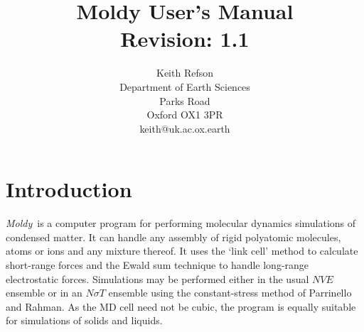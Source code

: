 % 
% 
% 
% 
\oddsidemargin=0in
\textwidth=6.5in
{\def\$#1${#1}%
\xdef\RCSrevision{\$Revision: 1.1 $}\xdef\manversA{$\$junk $ $}}
\title{{\Huge Moldy User's Manual}\\ \RCSrevision}
\author{Keith Refson\\Department of Earth Sciences\\Parks Road
\\Oxford OX1 3PR\\keith@uk.ac.ox.earth\\}

\newcommand{\moldy}{{\em Moldy}}
\newcommand{\etc}{{\em etc}}
\newcommand{\eg}{{\em e.g}.\ }
\newcommand{\ie}{{\em i.e}.\ }
\newcommand{\bm}[1]{\mbox{\boldmath \protect\(#1\protect\)}}

\newcommand{\erf}{\mbox{erf}}
\newcommand{\erfc}{\mbox{erfc}}

\maketitle
\tableofcontents

\chapter{Introduction}

\moldy\  is a computer program for performing molecular dynamics
simulations of condensed matter.  It can handle any assembly of rigid
polyatomic molecules, atoms or ions and any mixture thereof. It uses
the `link cell' method to calculate short-range forces and the Ewald
sum technique to handle long-range electrostatic forces.  Simulations
may be performed either in the usual $NVE$ ensemble or in an $N\sigma
T$ ensemble using the constant-stress method of Parrinello and Rahman.
As the MD cell need not be cubic, the program is equally suitable for
simulations of solids and liquids.

